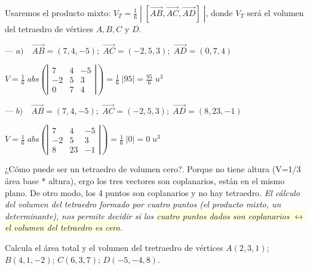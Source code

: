 \begin{proofw}\renewcommand{\qedsymbol}{$\diamond$}
	Usaremos el producto mixto: $V_T=\frac 1 6\;  |\; [\overrightarrow{AB},\overrightarrow{AC},\overrightarrow{AD}] \;|$, donde $V_T$ será el volumen del tetraedro de vértices $A,B,C \text{ y } D$.
	
\noindent	--- $a)\quad \overrightarrow{AB}=(7,4,-5);\; \overrightarrow{AC}=(-2,5,3); \; \overrightarrow{AD}=(0,7,4)$

\noindent $V=\frac 1 6 \; abs \left( {\left| \begin{matrix} 7&4&-5\\-2&5&3\\0&7&4 \end{matrix} \right|} \right) = \frac 1 6 \;|95|= \frac {95}{6} \; u^3$

\noindent	--- $b)\quad \overrightarrow{AB}=(7,4,-5);\; \overrightarrow{AC}=(-2,5,3); \; \overrightarrow{AD}=(8,23,-1)$

\noindent $V=\frac 1 6 \; abs \left( {\left| \begin{matrix} 7&4&-5\\-2&5&3\\8&23&-1 \end{matrix} \right|} \right) = \frac 1 6 \;|0|= 0 \; u^3$

\textcolor{gris}{¿Cómo puede ser un tetraedro de volumen cero?. Porque no tiene altura (V=1/3 área base * altura), ergo los tres vectores son coplanarios, están en el mismo plano. De otro modo, los 4 puntos son coplanarios y no hay tetraedro.} \textit{El cálculo del volumen del tetraedro formado por cuatro puntos (el producto mixto, un determinante), nos permite decidir si los \colorbox{LightYellow}{cuatro puntos dados son coplanarios $\leftrightarrow$ el volumen del tetraedro es cero}.}
	
\end{proofw}


\begin{ejre}
	Calcula el área total y el volumen del tretraedro de vértices $A(2,3,1)$; $B(4,1,-2)$; $C(6,3,7)$; $D(-5,-4,8)$.

\end{ejre}

